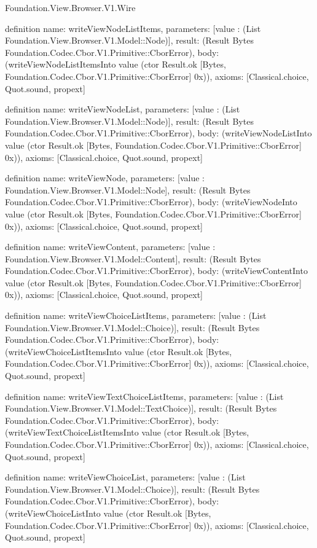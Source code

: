 \begin{lexlean}{Foundation.View.Browser.V1.Wire}
\begin{semanticmodule}
definition{
  name: writeViewNodeListItems,
  parameters: [value : (List Foundation.View.Browser.V1.Model::Node)],
  result: (Result Bytes Foundation.Codec.Cbor.V1.Primitive::CborError),
  body: (writeViewNodeListItemsInto value (ctor Result.ok [Bytes, Foundation.Codec.Cbor.V1.Primitive::CborError] 0x)),
  axioms: [Classical.choice, Quot.sound, propext]
}

definition{
  name: writeViewNodeList,
  parameters: [value : (List Foundation.View.Browser.V1.Model::Node)],
  result: (Result Bytes Foundation.Codec.Cbor.V1.Primitive::CborError),
  body: (writeViewNodeListInto value (ctor Result.ok [Bytes, Foundation.Codec.Cbor.V1.Primitive::CborError] 0x)),
  axioms: [Classical.choice, Quot.sound, propext]
}

definition{
  name: writeViewNode,
  parameters: [value : Foundation.View.Browser.V1.Model::Node],
  result: (Result Bytes Foundation.Codec.Cbor.V1.Primitive::CborError),
  body: (writeViewNodeInto value (ctor Result.ok [Bytes, Foundation.Codec.Cbor.V1.Primitive::CborError] 0x)),
  axioms: [Classical.choice, Quot.sound, propext]
}

definition{
  name: writeViewContent,
  parameters: [value : Foundation.View.Browser.V1.Model::Content],
  result: (Result Bytes Foundation.Codec.Cbor.V1.Primitive::CborError),
  body: (writeViewContentInto value (ctor Result.ok [Bytes, Foundation.Codec.Cbor.V1.Primitive::CborError] 0x)),
  axioms: [Classical.choice, Quot.sound, propext]
}

definition{
  name: writeViewChoiceListItems,
  parameters: [value : (List Foundation.View.Browser.V1.Model::Choice)],
  result: (Result Bytes Foundation.Codec.Cbor.V1.Primitive::CborError),
  body: (writeViewChoiceListItemsInto value (ctor Result.ok [Bytes, Foundation.Codec.Cbor.V1.Primitive::CborError] 0x)),
  axioms: [Classical.choice, Quot.sound, propext]
}

definition{
  name: writeViewTextChoiceListItems,
  parameters: [value : (List Foundation.View.Browser.V1.Model::TextChoice)],
  result: (Result Bytes Foundation.Codec.Cbor.V1.Primitive::CborError),
  body: (writeViewTextChoiceListItemsInto value (ctor Result.ok [Bytes, Foundation.Codec.Cbor.V1.Primitive::CborError] 0x)),
  axioms: [Classical.choice, Quot.sound, propext]
}

definition{
  name: writeViewChoiceList,
  parameters: [value : (List Foundation.View.Browser.V1.Model::Choice)],
  result: (Result Bytes Foundation.Codec.Cbor.V1.Primitive::CborError),
  body: (writeViewChoiceListInto value (ctor Result.ok [Bytes, Foundation.Codec.Cbor.V1.Primitive::CborError] 0x)),
  axioms: [Classical.choice, Quot.sound, propext]
}


\end{semanticmodule}
\end{lexlean}
